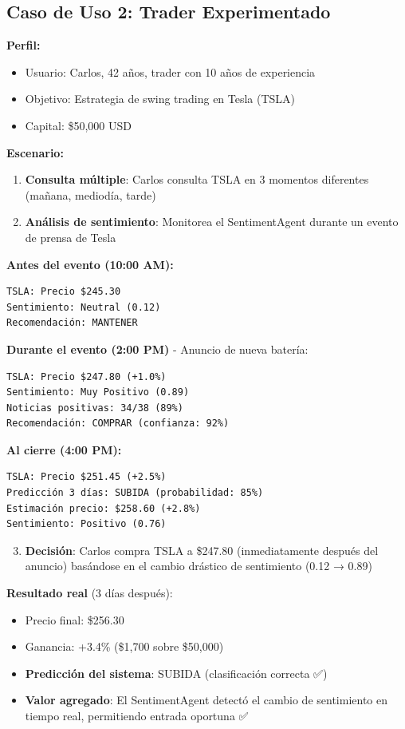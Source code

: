 \documentclass[12pt,a4paper]{report}
\begin{document}
\subsection{Caso de Uso 2: Trader Experimentado}

\textbf{Perfil:}
\begin{itemize}
    \item Usuario: Carlos, 42 años, trader con 10 años de experiencia
    \item Objetivo: Estrategia de swing trading en Tesla (TSLA)
    \item Capital: \$50,000 USD
\end{itemize}

\textbf{Escenario:}

\begin{enumerate}
    \item \textbf{Consulta múltiple}: Carlos consulta TSLA en 3 momentos diferentes (mañana, mediodía, tarde)
    \item \textbf{Análisis de sentimiento}: Monitorea el SentimentAgent durante un evento de prensa de Tesla
\end{enumerate}

\textbf{Antes del evento (10:00 AM):}
\begin{lstlisting}[language={}]
TSLA: Precio $245.30
Sentimiento: Neutral (0.12)
Recomendación: MANTENER
\end{lstlisting}

\textbf{Durante el evento (2:00 PM)} - Anuncio de nueva batería:
\begin{lstlisting}[language={}]
TSLA: Precio $247.80 (+1.0%)
Sentimiento: Muy Positivo (0.89)
Noticias positivas: 34/38 (89%)
Recomendación: COMPRAR (confianza: 92%)
\end{lstlisting}

\textbf{Al cierre (4:00 PM):}
\begin{lstlisting}[language={}]
TSLA: Precio $251.45 (+2.5%)
Predicción 3 días: SUBIDA (probabilidad: 85%)
Estimación precio: $258.60 (+2.8%)
Sentimiento: Positivo (0.76)
\end{lstlisting}

\begin{enumerate}
    \setcounter{enumi}{2}
    \item \textbf{Decisión}: Carlos compra TSLA a \$247.80 (inmediatamente después del anuncio) basándose en el cambio drástico de sentimiento (0.12 → 0.89)
\end{enumerate}

\textbf{Resultado real} (3 días después):
\begin{itemize}
    \item Precio final: \$256.30
    \item Ganancia: +3.4\% (\$1,700 sobre \$50,000)
    \item \textbf{Predicción del sistema}: SUBIDA (clasificación correcta ✅)
    \item \textbf{Valor agregado}: El SentimentAgent detectó el cambio de sentimiento en tiempo real, permitiendo entrada oportuna ✅
\end{itemize}
\end{document}
